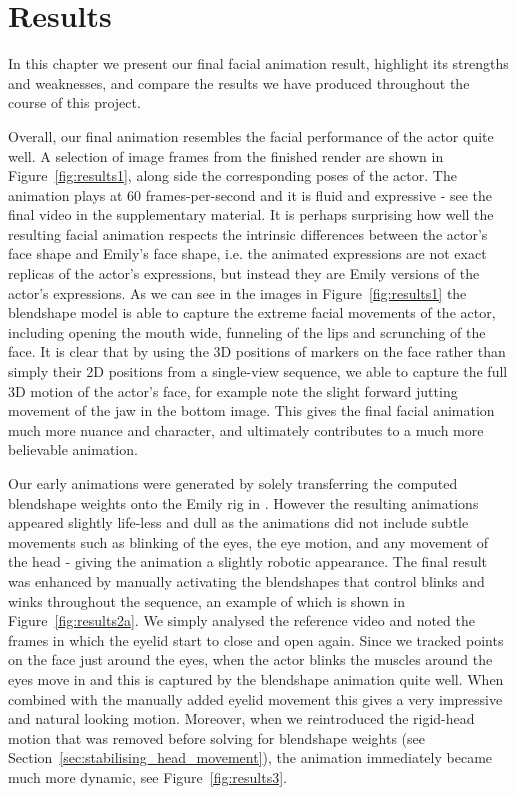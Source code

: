 \chapter{Results}
In this chapter we present our final facial animation result, highlight its strengths and weaknesses, and compare the results we have produced throughout the course of this project.

Overall, our final animation resembles the facial performance of the actor quite well. A selection of image frames from the finished render are shown in Figure~\ref{fig:results1}, along side the corresponding poses of the actor. The animation plays at $60$ frames-per-second and it is fluid and expressive - see the final video in the supplementary material. It is perhaps surprising how well the resulting facial animation respects the intrinsic differences between the actor's face shape and Emily's face shape, i.e. the animated expressions are not exact replicas of the actor's expressions, but instead they are Emily versions of the actor's expressions. As we can see in the images in Figure~\ref{fig:results1} the blendshape model is able to capture the extreme facial movements of the actor, including opening the mouth wide, funneling of the lips and scrunching of the face. It is clear that by using the 3D positions of markers on the face rather than simply their 2D positions from a single-view sequence, we able to capture the full 3D motion of the actor's face, for example note the slight forward jutting movement of the jaw in the bottom image. This gives the final facial animation much more nuance and character, and ultimately contributes to a much more believable animation.

Our early animations were generated by solely transferring the computed blendshape weights onto the Emily rig in \Maya. However the resulting animations appeared slightly life-less and dull as the animations did not include subtle movements such as blinking of the eyes, the eye motion, and any movement of the head - giving the animation a slightly robotic appearance. The final result was enhanced by manually activating the blendshapes that control blinks and winks throughout the sequence, an example of which is shown in Figure~\ref{fig:results2a}. We simply analysed the reference video and noted the frames in which the eyelid start to close and open again. Since we tracked points on the face just around the eyes, when the actor blinks the muscles around the eyes move in and this is captured by the blendshape animation quite well. When combined with the manually added eyelid movement this gives a very impressive and natural looking motion. Moreover, when we reintroduced the rigid-head motion that was removed before solving for blendshape weights (see Section~\ref{sec:stabilising_head_movement}), the animation immediately became much more dynamic, see Figure~\ref{fig:results3}.

